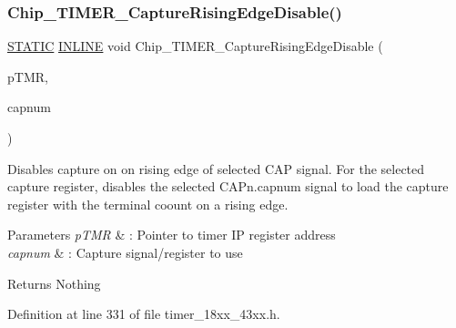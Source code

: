 \subsubsection{\texorpdfstring{Chip\+\_\+\+T\+I\+M\+E\+R\+\_\+\+Capture\+Rising\+Edge\+Disable()}{Chip\_TIMER\_CaptureRisingEdgeDisable()}}
{\footnotesize\ttfamily \hyperlink{group___l_p_c___types___public___macros_ga10b2d890d871e1489bb02b7e70d9bdfb}{S\+T\+A\+T\+IC} \hyperlink{spifi__18xx__43xx_8h_a2eb6f9e0395b47b8d5e3eeae4fe0c116}{I\+N\+L\+I\+NE} void Chip\+\_\+\+T\+I\+M\+E\+R\+\_\+\+Capture\+Rising\+Edge\+Disable (\begin{DoxyParamCaption}\item[{\hyperlink{struct_l_p_c___t_i_m_e_r___t}{L\+P\+C\+\_\+\+T\+I\+M\+E\+R\+\_\+T} $\ast$}]{p\+T\+MR,  }\item[{int8\+\_\+t}]{capnum }\end{DoxyParamCaption})}



Disables capture on on rising edge of selected C\+AP signal. For the selected capture register, disables the selected C\+A\+Pn.\+capnum signal to load the capture register with the terminal coount on a rising edge. 


\begin{DoxyParams}{Parameters}
{\em p\+T\+MR} & \+: Pointer to timer IP register address \\
\hline
{\em capnum} & \+: Capture signal/register to use \\
\hline
\end{DoxyParams}
\begin{DoxyReturn}{Returns}
Nothing 
\end{DoxyReturn}


Definition at line 331 of file timer\+\_\+18xx\+\_\+43xx.\+h.

\mbox{\label{group___t_i_m_e_r__18_x_x__43_x_x_ga7768003112560a8cbd06582fa8747fae}} 
